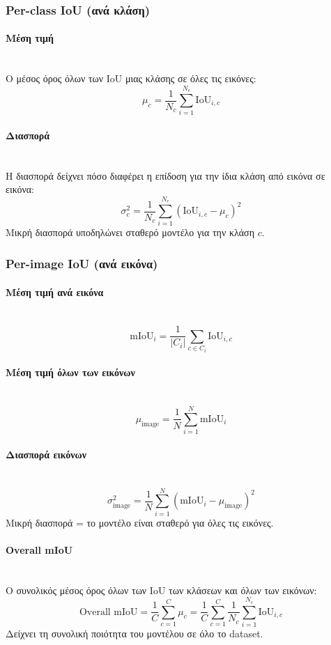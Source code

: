 \documentclass[12pt]{article}
\begin{document}
    \subsubsection{Per-class IoU (ανά κλάση)}
    \paragraph{Μέση τιμή}
    \mbox{}\\
    Ο μέσος όρος όλων των IoU μιας κλάσης σε όλες τις εικόνες:
    \[
    \mu_c = \frac{1}{N_c} \sum_{i=1}^{N_c} \text{IoU}_{i,c}
    \]
    
    \paragraph{Διασπορά }
    \mbox{}\\
    Η διασπορά δείχνει πόσο διαφέρει η επίδοση για την ίδια κλάση από εικόνα σε εικόνα:
    \[
    \sigma_c^2 = \frac{1}{N_c} \sum_{i=1}^{N_c} (\text{IoU}_{i,c} - \mu_c)^2
    \]
    Μικρή διασπορά υποδηλώνει σταθερό μοντέλο για την κλάση \(c\).
    
    \subsubsection{Per-image IoU (ανά εικόνα)}
    \paragraph{Μέση τιμή ανά εικόνα}
    \mbox{}\\
    \[
    \text{mIoU}_i = \frac{1}{|C_i|} \sum_{c \in C_i} \text{IoU}_{i,c}
    \]
    
    \paragraph{Μέση τιμή όλων των εικόνων}
    \mbox{}\\
    \[
    \mu_\text{image} = \frac{1}{N} \sum_{i=1}^{N} \text{mIoU}_i
    \]
    
    \paragraph{Διασπορά εικόνων}
    \mbox{}\\
    \[
    \sigma_\text{image}^2 = \frac{1}{N} \sum_{i=1}^{N} (\text{mIoU}_i - \mu_\text{image})^2
    \]
    Μικρή διασπορά = το μοντέλο είναι σταθερό για όλες τις εικόνες.
    
    \paragraph{Overall mIoU}
    \mbox{}\\
    Ο συνολικός μέσος όρος όλων των IoU των κλάσεων και όλων των εικόνων:
    \[
    \text{Overall mIoU} = \frac{1}{C} \sum_{c=1}^{C} \mu_c = \frac{1}{C} \sum_{c=1}^{C} \frac{1}{N_c} \sum_{i=1}^{N_c} \text{IoU}_{i,c}
    \]
    Δείχνει τη συνολική ποιότητα του μοντέλου σε όλο το dataset.
    
\end{document}
